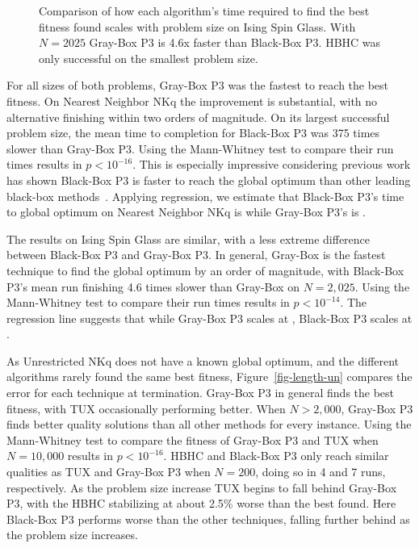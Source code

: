 \begin{figure}
  \centering
  \caption{Comparison of how each algorithm's time required to find the best fitness found scales with problem size
  on Ising Spin Glass. With $N=2025$ Gray-Box P3 is 4.6x faster than Black-Box P3.
  HBHC was only successful on the smallest problem size.}
  \label{fig-length-is}
\end{figure}

For all sizes of both problems, Gray-Box P3 was the fastest to reach the best fitness. On
Nearest Neighbor NKq the improvement is substantial, with no alternative finishing within
two orders of magnitude. On its largest successful problem size, the mean time to completion for
Black-Box P3 was 375 times slower than Gray-Box P3. Using the Mann-Whitney test to compare their run times
results in $p < 10^{-16}$. This is especially impressive considering
previous work has shown Black-Box P3 is faster to reach the global optimum than other leading black-box
methods~\cite{goldman:2015:fastp3}. Applying regression, we estimate that Black-Box P3's time to global optimum
on Nearest Neighbor NKq is  while Gray-Box P3's is .

The results on Ising Spin Glass are similar, with a less extreme difference between
Black-Box P3 and Gray-Box P3. In general,
Gray-Box is the fastest technique to
find the global optimum by an order of magnitude, with Black-Box P3's mean run finishing
4.6 times slower than Gray-Box on $N=2,025$. Using the Mann-Whitney test to compare their run times
results in $p < 10^{-14}$. The regression line suggests that while
Gray-Box P3 scales at , Black-Box P3 scales at .

As Unrestricted NKq does not have a known global optimum, and the different algorithms
rarely found the same best fitness, Figure~\ref{fig-length-un} compares the error
for each technique at termination. Gray-Box P3 in general finds the best fitness,
with TUX occasionally performing better. When $N>2,000$, Gray-Box P3 finds better quality
solutions than all other methods for every instance.  Using the Mann-Whitney test to compare the fitness
of Gray-Box P3 and TUX when $N=10,000$ results in $p < 10^{-16}$. HBHC and Black-Box P3 only reach similar
qualities as TUX and Gray-Box P3 when $N=200$, doing so in 4 and 7 runs, respectively. As the problem
size increase TUX begins to fall behind Gray-Box P3, with the HBHC stabilizing at about 2.5\% worse than
the best found. Here Black-Box P3 performs worse than the other techniques,
falling further behind as the problem size increases.

